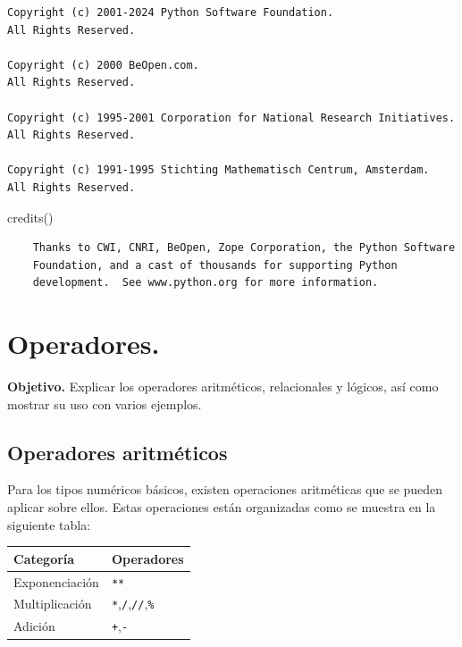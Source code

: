 \documentclass[
  spanish,
  letterpaper,
]{scrbook}
\newenvironment{Shaded}{\begin{snugshade}}{\end{snugshade}}
\newcommand{\NormalTok}[1]{\textcolor[rgb]{0.00,0.23,0.31}{#1}}
\theoremstyle{definition}
\theoremstyle{remark}
\begin{document}
\begin{verbatim}
Copyright (c) 2001-2024 Python Software Foundation.
All Rights Reserved.

Copyright (c) 2000 BeOpen.com.
All Rights Reserved.

Copyright (c) 1995-2001 Corporation for National Research Initiatives.
All Rights Reserved.

Copyright (c) 1991-1995 Stichting Mathematisch Centrum, Amsterdam.
All Rights Reserved.
\end{verbatim}

\begin{Shaded}
\begin{Highlighting}[]
\NormalTok{credits()}
\end{Highlighting}
\end{Shaded}

\begin{verbatim}
    Thanks to CWI, CNRI, BeOpen, Zope Corporation, the Python Software
    Foundation, and a cast of thousands for supporting Python
    development.  See www.python.org for more information.
\end{verbatim}

\chapter{Operadores.}\label{sec-c-operadores}

\textbf{Objetivo.} Explicar los operadores aritméticos, relacionales y
lógicos, así como mostrar su uso con varios ejemplos.

\section{Operadores aritméticos}\label{sec-c-operadores-aritmeticos}

Para los tipos numéricos básicos, existen operaciones aritméticas que se
pueden aplicar sobre ellos. Estas operaciones están organizadas como se
muestra en la siguiente tabla:

\begin{longtable}[]{@{}ll@{}}
\toprule\noalign{}
Categoría & Operadores \\
\midrule\noalign{}
\endhead
\bottomrule\noalign{}
\endlastfoot
Exponenciación & \texttt{**} \\
Multiplicación & \texttt{*},\texttt{/},\texttt{//},\texttt{\%} \\
Adición & \texttt{+},\texttt{-} \\
\end{longtable}
\end{document}
